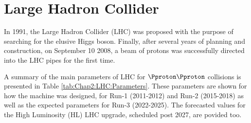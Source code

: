 \begin{comment}
Important breakthroughs and advances have been done by CERN on three main technical fields: accelerators, detectors and computing.
Behind these three areas of technology, lies a great number of topics of expertise: cryogenics, ultra-high vacuums, particle tracking, 
radiation monitoring, superconductivity, plasma-physics and many more. Probably, the most popular of the contributions is the 
invention of the World Wide Web (WWW) in 1989 at CERN facilities \cite{Berners-Lee:2639699}. All of this proves the versatility and capability of CERN as
a contributor to science, technology and society.
\end{comment}

\section{Large Hadron Collider}
\label{sec:Chap2:LHC}
\begin{comment}
In the middle of the 80's, the plans for building the LHC were started.
At several  high-energy physics workshops and conferences, the idea of assembling a machine able to 
reach multi-TeV energies was discussed. This instrument would allow physicists to search for the Higgs
boson at all possible masses. In 1991 the Long-Range Planning Committee of CERN proposed the
construction of the LHC as the best step forward in CERN's future . The approval of
the LHC project arrived in 1994 and in 1995 the Conceptual Design Report was published \cite{Pettersson:291782}. 
 on 10 September 2008, a beam of protons was successfully  directed into the LHC pipes for the first time.
\end{comment}
In 1991, the Large Hadron Collider (LHC) was proposed with the purpose of searching 
for the elusive Higgs boson\cite{LHC_fundations}\cite{Pettersson:291782}. 
Finally, after several years of planning and construction, on September 10  2008, 
a beam of protons was successfully  directed into the LHC pipes for the first time.


A summary of the main parameters of LHC for $\Pproton\Pproton$ collisions 
is presented in Table \ref{tab:Chap2:LHC:Parameters}. These parameters are shown for how
the machine was designed, for Run-1 (2011-2012) and Run-2 (2015-2018) as well as the expected parameters for Run-3 (2022-2025).
The forecasted values for the High Luminosity (HL) LHC upgrade, scheduled post 2027, are povided too.

